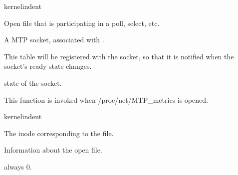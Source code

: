 \documentclass[letterpaper,10pt,english]{sphinxmanual}
\begin{document}
\begin{sphinxuseclass}{kernelindent}
\sphinxAtStartPar
{}
\begin{description}
\sphinxAtStartPar
Open file that is participating in a poll, select, etc.

\sphinxAtStartPar
A MTP socket, associated with .

\sphinxAtStartPar
This table will be registered with the socket, so that it
is notified when the socket’s ready state changes.

\end{description}

\sphinxAtStartPar
{}
\begin{description}
\sphinxAtStartPar
state of the socket.

\end{description}

\end{sphinxuseclass}

\begin{fulllineitems}
\label{\detokenize{mtpimpl.c:c.MTP_metrics_open}}
\pysigstartsignatures
\pysigstartmultiline
{}
\pysigstopmultiline
\pysigstopsignatures
\sphinxAtStartPar
This function is invoked when /proc/net/MTP\_metrics is opened.

\end{fulllineitems}


\begin{sphinxuseclass}{kernelindent}
\sphinxAtStartPar
{}
\begin{description}
\sphinxAtStartPar
The inode corresponding to the file.

\sphinxAtStartPar
Information about the open file.

\end{description}

\sphinxAtStartPar
{}

\sphinxAtStartPar
always 0.

\end{sphinxuseclass}
\end{document}
